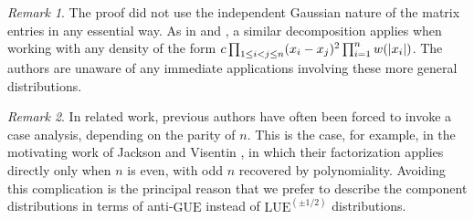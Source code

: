 \documentclass[pdftex, oneside, 10pt, letterpaper]{amsart}
\theoremstyle{plain}
\theoremstyle{definition}
\theoremstyle{remark}
\newtheorem*{rem}{Remark}
\begin{document}
\begin{rem}
  The proof did not use the independent Gaussian nature of the matrix
  entries in any essential way.  As in
  \cite[Eq.~2.6]{Forrester-Evenness} and
  \cite[Sec~8.4.1]{Forrester-Log-gases}, a similar decomposition
  applies when working with any density of the form $c\prod_{1\leq
    i<j\leq n}(x_i-x_j)^2 \prod_{i=1}^nw({{\ifx\relax{}\relax\else\fi}{{}}\lvert{x_i}{{}}\rvert})$.  The authors are
  unaware of any immediate applications involving these more general
  distributions.
\end{rem}

\begin{rem}
  In related work, previous authors have often been forced to invoke a
  case analysis, depending on the parity of $n$.  This is the case,
  for example, in the motivating work of Jackson and Visentin
  \cite{JV-Characters,JV-Eulerian}, in which their factorization
  applies directly only when $n$ is even, with odd $n$ recovered by
  polynomiality.  Avoiding this complication is the principal reason
  that we prefer to describe the component distributions in terms of
  anti-{\ensuremath{\mathrm{GUE}}}{} instead of ${\ensuremath{\mathrm{LUE}}}^{(\pm1/2)}$ distributions.
\end{rem}
\end{document}
